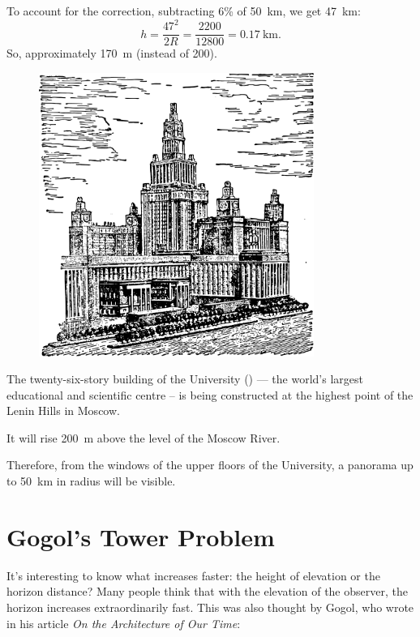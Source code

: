 To account for the correction, subtracting 6\% of \SI{50}{\kilo\meter}, we get \SI{47}{\kilo\meter}:
\begin{equation*}%
h = \frac{47^{2}}{2R} = \frac{2200}{12800} = \SI{0.17}{\kilo\meter}.
\end{equation*}
So, approximately \SI{170}{\meter} (instead of 200).
\begin{figure}[h!]
\centering
\includegraphics[width=0.8\textwidth]{figures/ch-06/fig-104.pdf}
\end{figure}


The twenty-six-story building of the University () — the world's largest educational and scientific centre -- is being constructed at the highest point of the Lenin Hills in Moscow.

It will rise \SI{200}{\meter} above the level of the Moscow River.

Therefore, from the windows of the upper floors of the University, a panorama up to \SI{50}{\kilo\meter} in radius will be visible.

\clearpage

\section{Gogol's Tower Problem}
\label{sec-6.4}

It's interesting to know what increases faster: the height of elevation or the horizon distance? Many people think that with the elevation of the observer, the horizon increases extraordinarily fast. This was also thought by Gogol, who wrote in his article \emph{On the Architecture of Our Time}:

